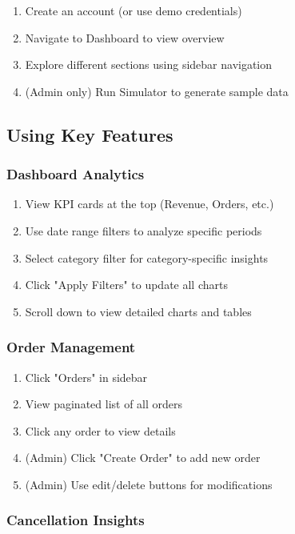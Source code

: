 \documentclass[12pt,a4paper]{article}
\begin{document}
\begin{enumerate}[leftmargin=*]
    \item Create an account (or use demo credentials)
    \item Navigate to Dashboard to view overview
    \item Explore different sections using sidebar navigation
    \item (Admin only) Run Simulator to generate sample data
\end{enumerate}

\subsection{Using Key Features}

\subsubsection{Dashboard Analytics}

\begin{enumerate}[leftmargin=*]
    \item View KPI cards at the top (Revenue, Orders, etc.)
    \item Use date range filters to analyze specific periods
    \item Select category filter for category-specific insights
    \item Click "Apply Filters" to update all charts
    \item Scroll down to view detailed charts and tables
\end{enumerate}

\subsubsection{Order Management}

\begin{enumerate}[leftmargin=*]
    \item Click "Orders" in sidebar
    \item View paginated list of all orders
    \item Click any order to view details
    \item (Admin) Click "Create Order" to add new order
    \item (Admin) Use edit/delete buttons for modifications
\end{enumerate}

\subsubsection{Cancellation Insights}
\end{document}
